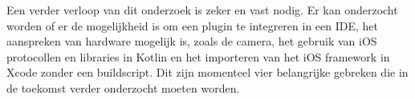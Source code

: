 Een verder verloop van dit onderzoek is zeker en vast nodig. Er kan onderzocht worden of er de mogelijkheid is om een plugin te integreren in een IDE, het aanspreken van hardware mogelijk is, zoals de camera, het gebruik van iOS protocollen en libraries in Kotlin en het importeren van het iOS framework in Xcode zonder een buildscript. Dit zijn momenteel vier belangrijke gebreken die in de toekomst verder onderzocht moeten worden.